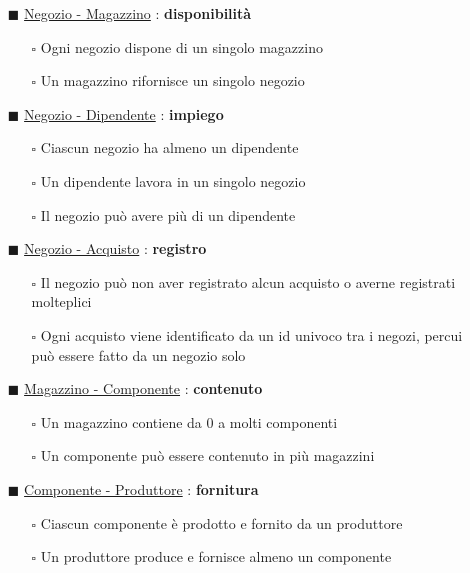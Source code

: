 \begin{itemize}

\item[$\blacksquare$] \underline{Negozio - Magazzino} : \textbf{disponibilità}
\begin{itemize}
\item[$\square$] Ogni negozio dispone di un singolo magazzino
\item[$\square$]Un magazzino rifornisce un singolo negozio
\end{itemize}

\item[$\blacksquare$]\underline{Negozio - Dipendente} : \textbf{impiego}
\begin{itemize}
\item[$\square$]Ciascun negozio ha almeno un dipendente
\item[$\square$]Un dipendente lavora in un singolo negozio
\item[$\square$]Il negozio può avere più di un dipendente
\end{itemize}

\item[$\blacksquare$]\underline{Negozio - Acquisto} : \textbf{registro}
\begin{itemize}
\item[$\square$]Il negozio può non aver registrato alcun acquisto o averne registrati molteplici
\item[$\square$]Ogni acquisto viene identificato da un id univoco tra i negozi, percui può essere fatto da un negozio solo
\end{itemize}

\item[$\blacksquare$]\underline{Magazzino - Componente} : \textbf{contenuto}
\begin{itemize}
\item[$\square$]Un magazzino contiene da 0 a molti componenti
\item[$\square$]Un componente può essere contenuto in più magazzini
\end{itemize}

\item[$\blacksquare$]\underline{Componente - Produttore} : \textbf{fornitura}
\begin{itemize}
\item[$\square$]Ciascun componente è prodotto e fornito da un produttore
\item[$\square$]Un produttore produce e fornisce almeno un componente
\end{itemize}


\end{itemize}
